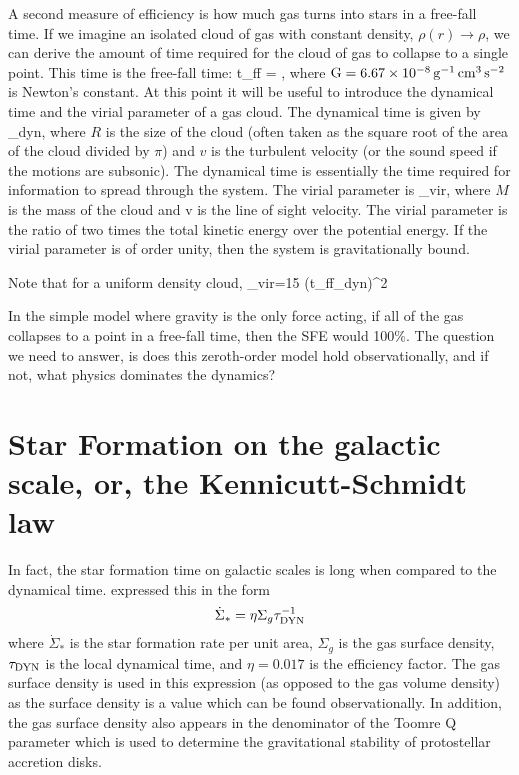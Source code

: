\documentclass[../dissertation.tex]{subfiles}
\begin{document}
A second measure of efficiency is how much gas turns into stars in a free-fall time. If we imagine an isolated cloud of gas with constant density, $\rho(r) \rightarrow \rho$, we can derive the amount of time required for the cloud of gas to collapse to a single point.
This time is the free-fall time:
%
\be
t_{\rm ff} = ,
\ee
%
where $ {\rm G} = 6.67 \times 10^{-8}\, {\rm g}^{-1}\,\rm cm^3\,\rm s^{-2} $ is Newton's constant. At this point it will be useful to introduce the dynamical time and the virial parameter of a gas cloud. The dynamical time is given by
%
\be
\tau_{\rm dyn},
\ee
%
where $R$ is the size of the cloud (often taken as the square root of the area of the cloud divided by $\pi$) and $v$ is the turbulent velocity (or the sound speed if the motions are subsonic). 
The dynamical time is essentially the time required for information to spread through the system. 
The virial parameter is
%
\be
\alpha_{\rm vir},
\ee
%
where $M$ is the mass of the cloud and v is the line of sight velocity. 
The virial parameter is the ratio of two times the total kinetic energy over the potential energy. 
If the virial parameter is of order unity, then the system is gravitationally bound.

Note that for a uniform density cloud,
%
\be
\alpha_{\rm vir}={15\pi} \left({t_{\rm ff}\over \tau_{\rm dyn}}\right)^2
\ee
%

In the simple model where gravity is the only force acting, if all of the gas collapses to a point in a free-fall time, then the SFE would 100\%.
The question we need to answer, is does this zeroth-order model hold observationally, and if not, what physics dominates the dynamics?

\section{Star Formation on the galactic scale, or, the Kennicutt-Schmidt law}
In fact, the star formation time on galactic scales is long when compared to the dynamical time. 
\citet{1998ApJ...498..541K} expressed this in the form
%
\begin{equation}\label{eq:intro_KS_law}
\dot{\Sigma}_* = \eta\Sigma_g \tau_{\rm DYN}^{-1}
\end{equation}
%
where $\dot{\Sigma}_*$ is the star formation rate per unit area, $\Sigma_g$ is the 
gas surface density, $\tau_{\rm DYN}$ is the local dynamical time, and $\eta = 0.017$ 
is the efficiency factor.  
The gas surface density is used in this expression (as opposed to the gas volume density) as the surface density is a value which can be found observationally. 
In addition, the gas surface density also appears in the denominator of the Toomre Q parameter which is used to determine the gravitational stability of protostellar accretion disks. 
\end{document}
